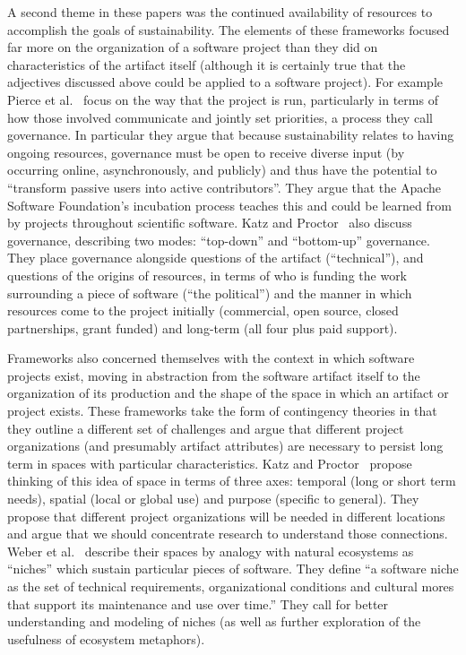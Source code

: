 \documentclass[11pt, oneside]{amsart}
\begin{document}
A second theme in these papers was the continued availability of
resources to accomplish the goals of sustainability. The elements of
these frameworks focused far more on the organization of a software
project than they did on characteristics of the artifact itself
(although it is certainly true that the adjectives discussed above
could be applied to a software project). For example Pierce et
al.~\cite{Pierce_WSSSPE} focus on the way that the project is run,
particularly in terms of how those involved communicate and jointly
set priorities, a process they call governance. In particular they
argue that because sustainability relates to having ongoing resources,
governance must be open to receive diverse input (by occurring online,
asynchronously, and publicly) and thus have the potential to
``transform passive users into active contributors''. They argue that
the Apache Software Foundation's incubation process teaches this and
could be learned from by projects throughout scientific software.
Katz and Proctor~\cite{Katz_WSSSPE} also discuss governance,
describing two modes: ``top-down'' and ``bottom-up'' governance.  They
place governance alongside questions of the artifact (``technical''),
and questions of the origins of resources, in terms of who is funding
the work surrounding a piece of software (``the political'') and the
manner in which resources come to the project initially (commercial,
open source, closed partnerships, grant funded) and long-term (all
four plus paid support).

Frameworks also concerned themselves with the context in which software
projects exist, moving in abstraction from the software artifact
itself to the organization of its production and
the shape of the space in which an artifact or project exists.
These frameworks take the form of contingency theories in that
they outline a different set of challenges and argue that different
project organizations (and presumably artifact attributes) are
necessary to persist long term in spaces with particular
characteristics.  Katz and Proctor~\cite{Katz_WSSSPE} propose thinking
of this idea of space in terms of three axes: temporal (long or short
term needs), spatial (local or global use) and purpose (specific to
general).  They propose that different project organizations will be
needed in different locations and argue that we should concentrate
research to understand those connections. Weber et
al.~\cite{Weber_WSSSPE} describe their spaces by analogy with natural
ecosystems as ``niches'' which sustain particular pieces of
software. They define ``a software niche as the set of technical
requirements, organizational conditions and cultural mores that
support its maintenance and use over time.'' They call for better
understanding and modeling of niches (as well as further exploration
of the usefulness of ecosystem metaphors).
\end{document}
